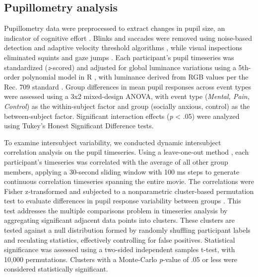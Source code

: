\subsection{Pupillometry analysis} \label{pupil-methods}
Pupillometry data were preprocessed to extract changes in pupil size, an indicator of cognitive effort \citep{beatty1982}. Blinks and saccades were removed using noise-based detection and adaptive velocity threshold algorithms \citep{hershman2018,nystrom2010}, while visual inspections eliminated squints and gaze jumps \citep{mathot2018}. Each participant's pupil timeseries was standardized (\textit{z}-scored) and adjusted for global luminance variations using a 5th-order polynomial model in R \citep{bates2015}, with luminance derived from RGB values per the Rec. 709 standard \citep{itu2002}. Group differences in mean pupil responses across event types were assessed using a 3x2 mixed-design ANOVA, with event type (\textit{Mental, Pain, Control}) as the within-subject factor and group (socially anxious, control) as the between-subject factor. Significant interaction effects (\textit{p} < .05) were analyzed using Tukey's Honest Significant Difference tests. 

To examine intersubject variability, we conducted dynamic intersubject correlation analysis on the pupil timeseries. Using a leave-one-out method \citep{nastase2019}, each participant's timeseries was correlated with the average of all other group members, applying a 30-second sliding window with 100 ms steps to generate continuous correlation timeseries spanning the entire movie. The correlations were Fisher z-transformed and subjected to a nonparametric cluster-based permutation test to evaluate differences in pupil response variability between groups \citep{maris2007}. This test addresses the multiple comparisons problem in timeseries analysis by aggregating significant adjacent data points into clusters. These clusters are tested against a null distribution formed by randomly shuffling participant labels and reculating statistics, effectively controlling for false positives. Statistical significance was assessed using a two-sided independent samples t-test, with 10,000 permutations. Clusters with a Monte-Carlo \textit{p}-value of .05 or less were considered statistically significant.


